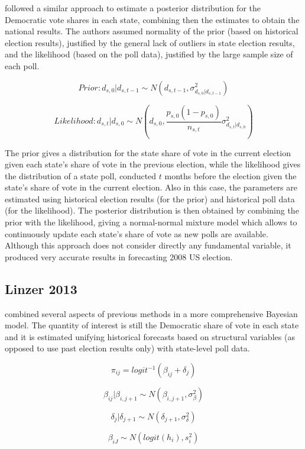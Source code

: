 \documentclass[
  12pt]{article}
\begin{document}
\citep{loc:gel:2010} followed a similar approach to estimate a posterior
distribution for the Democratic vote shares in each state, combining
then the estimates to obtain the national results. The authors assumed
normality of the prior (based on historical election results), justified
by the general lack of outliers in state election results, and the
likelihood (based on the poll data), justified by the large sample size
of each poll.

\[Prior: d_{s,0}|d_{s,t-1} \sim N(d_{s,t-1}, \sigma^2_{d_{s,0}|d_{s,t-1}})\]

\[Likelihood: d_{s,t}|d_{s,0} \sim N(d_{s,0}, \frac{p_{s,0}(1-p_{s,0})}{n_{s,t}} \sigma^2_{d_{s,t}|d_{s,0}})\]

The prior gives a distribution for the state share of vote in the
current election given each state's share of vote in the previous
election, while the likelihood gives the distribution of a state poll,
conducted \(t\) months before the election given the state's share of
vote in the current election. Also in this case, the parameters are
estimated using historical election results (for the prior) and
historical poll data (for the likelihood). The posterior distribution is
then obtained by combining the prior with the likelihood, giving a
normal-normal mixture model which allows to continuously update each
state's share of vote as new polls are available. Although this approach
does not consider directly any fundamental variable, it produced very
accurate results in forecasting 2008 US election.

\hypertarget{linzer-2013}{%
\subsection{Linzer 2013}\label{linzer-2013}}

\citep{lin:2013} combined several aspects of previous methods in a more
comprehensive Bayesian model. The quantity of interest is still the
Democratic share of vote in each state and it is estimated unifying
historical forecasts based on structural variables (as opposed to use
past election results only) with state-level poll data.

\[\pi_{ij} = logit^{-1}(\beta_{ij} + \delta_j)\]

\[\beta_{ij} | \beta_{i,j+1} \sim N(\beta_{i,j+1}, \sigma^2_{\beta})\]

\[\delta_{j} | \delta_{j+1} \sim N(\delta_{j+1}, \sigma^2_{\delta})\]

\[ \beta_{iJ} \sim N(logit(h_i), s_i^2)\]
\end{document}

